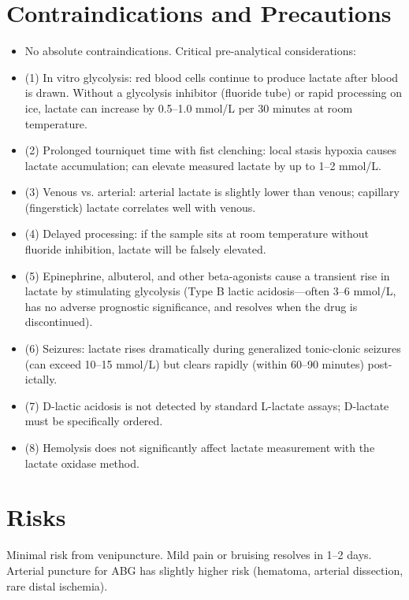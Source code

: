 \section*{Contraindications and Precautions}
\begin{itemize}
  \item No absolute contraindications. Critical pre-analytical considerations:
  \item (1) In vitro glycolysis: red blood cells continue to produce lactate after blood is drawn. Without a glycolysis inhibitor (fluoride tube) or rapid processing on ice, lactate can increase by 0.5--1.0 mmol/L per 30 minutes at room temperature.
  \item (2) Prolonged tourniquet time with fist clenching: local stasis hypoxia causes lactate accumulation; can elevate measured lactate by up to 1--2 mmol/L.
  \item (3) Venous vs. arterial: arterial lactate is slightly lower than venous; capillary (fingerstick) lactate correlates well with venous.
  \item (4) Delayed processing: if the sample sits at room temperature without fluoride inhibition, lactate will be falsely elevated.
  \item (5) Epinephrine, albuterol, and other beta-agonists cause a transient rise in lactate by stimulating glycolysis (Type B lactic acidosis---often 3--6 mmol/L, has no adverse prognostic significance, and resolves when the drug is discontinued).
  \item (6) Seizures: lactate rises dramatically during generalized tonic-clonic seizures (can exceed 10--15 mmol/L) but clears rapidly (within 60--90 minutes) post-ictally.
  \item (7) D-lactic acidosis is not detected by standard L-lactate assays; D-lactate must be specifically ordered.
  \item (8) Hemolysis does not significantly affect lactate measurement with the lactate oxidase method.
\end{itemize}
\section*{Risks}
Minimal risk from venipuncture. Mild pain or bruising resolves in 1--2 days. Arterial puncture for ABG has slightly higher risk (hematoma, arterial dissection, rare distal ischemia).

